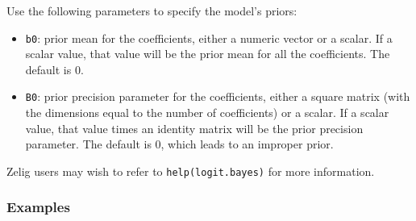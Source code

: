 Use the following parameters to specify the model's priors:  
\begin{itemize}
\item \texttt{b0}: prior mean for the coefficients, either a numeric 
vector or a scalar. If a scalar value, that value will
be the prior mean for all the coefficients. The default is 0.

\item \texttt{B0}: prior precision parameter for the coefficients,
either a square matrix (with the dimensions equal to the number of
coefficients) or a scalar. If a scalar value, that value times an
identity matrix will be the prior precision parameter. The default is
0, which leads to an improper prior.

\end{itemize}

Zelig users may wish to refer to \texttt{help(logit.bayes)} for more information.



\subsubsection{Examples}

